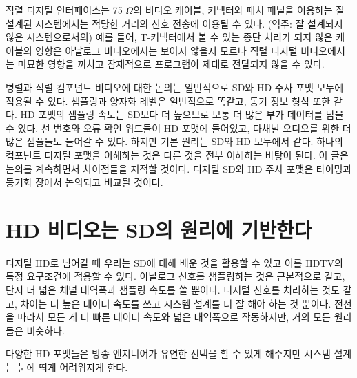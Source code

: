 직렬 디지털 인터페이스는 75 $\Omega$의 비디오 케이블, 커넥터와 패치 패널을 이용하는 잘 설계된 시스템에서는 적당한 거리의 신호 전송에 이용될 수 있다.
(역주: 잘 설계되지 않은 시스템으로서의) 예를 들어, T-커넥터에서 볼 수 있는 종단 처리가 되지 않은 케이블의 영향은 아날로그 비디오에서는 보이지 않을지 모르나 직렬 디지털 비디오에서는 미묘한 영향을 끼치고 잠재적으로 프로그램이 제대로 전달되지 않을 수 있다.

병렬과 직렬 컴포넌트 비디오에 대한 논의는 일반적으로 SD와 HD 주사 포맷 모두에 적용될 수 있다. 샘플링과 양자화 레벨은 일반적으로 똑같고, 동기 정보 형식 또한 같다. HD 포맷의 샘플링 속도는 SD보다 더 높으므로 보통 더 많은 부가 데이터를 담을 수 있다.
선 번호와 오류 확인 워드들이 HD 포맷에 들어있고, 다채널 오디오를 위한 더 많은 샘플들도 들어갈 수 있다. 하지만 기본 원리는 SD와 HD 모두에서 같다. 하나의 컴포넌트 디지털 포맷을 이해하는 것은 다른 것을 전부 이해하는 바탕이 된다.
이 글은 논의를 계속하면서 차이점들을 지적할 것이다. 디지털 SD와 HD 주사 포맷은 타이밍과 동기화 장에서 논의되고 비교될 것이다.

\section{HD 비디오는 SD의 원리에 기반한다}
디지털 HD로 넘어갈 때 우리는 SD에 대해 배운 것을 활용할 수 있고 이를 HDTV의 특정 요구조건에 적용할 수 있다. 아날로그 신호를 샘플링하는 것은 근본적으로 같고, 단지 더 넓은 채널 대역폭과 샘플링 속도를 쓸 뿐이다.
디지털 신호를 처리하는 것도 같고, 차이는 더 높은 데이터 속도를 쓰고 시스템 설계를 더 잘 해야 하는 것 뿐이다. 전선을 따라서 모든 게 더 빠른 데이터 속도와 넓은 대역폭으로 작동하지만, 거의 모든 원리들은 비슷하다.


다양한 HD 포맷들은 방송 엔지니어가 유연한 선택을 할 수 있게 해주지만 시스템 설계는 눈에 띄게 어려워지게 한다.

